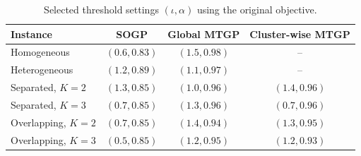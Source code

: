 \begin{table}[t]
\centering\footnotesize
\caption{Selected threshold settings $(\iota,\alpha)$ using the original objective.}
\begin{tabular}{lccc}\toprule
Instance & SOGP & Global MTGP & Cluster-wise MTGP\\\midrule
Homogeneous & $(0.6,0.83)$ & $(1.5,0.98)$ & --\\
Heterogeneous & $(1.2,0.89)$ & $(1.1,0.97)$ & --\\
Separated, $K=2$ & $(1.3,0.85)$ & $(1.0,0.96)$ & $(1.4,0.96)$\\
Separated, $K=3$ & $(0.7,0.85)$ & $(1.3,0.96)$ & $(0.7,0.96)$\\
Overlapping, $K=2$ & $(0.7,0.85)$ & $(1.4,0.94)$ & $(1.3,0.95)$\\
Overlapping, $K=3$ & $(0.5,0.85)$ & $(1.2,0.95)$ & $(1.2,0.93)$\\
\bottomrule\end{tabular}\end{table}
